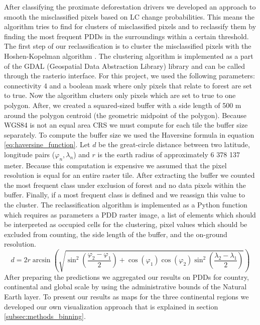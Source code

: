 			After classifying the proximate deforestation drivers we developed an approach to smooth the misclassified pixels based on \ac{LC} change probabilities. This means the algorithm tries to find for clusters of misclassified pixels and to reclassify them by finding the most frequent \acp{PDD} in the surroundings within a certain threshold. The first step of our reclassification is to cluster the misclassified pixels with the Hoshen-Kopelman algorithm \citep{Hoshen1998}. The clustering algorithm is implemented as a part of the GDAL (Geospatial Data Abstraction Library) library and can be called through the rasterio interface. For this project, we used the following parameters: connectivity 4 and a boolean mask where only pixels that relate to forest are set to true. Now the algorithm clusters only pixels which are set to true to one polygon. After, we created a squared-sized buffer with a side length of 500 m around the polygon centroid (the geometric midpoint of the polygon). Because \ac{WGS84} is not an equal area \ac{CRS} we must compute for each tile the buffer size separately. To compute the buffer size we used the Haversine formula in equation \ref{eq:haversine_function}. Let $d$ be the great-circle distance between two latitude, longitude pairs ($\varphi_n, \lambda_n$) and $r$ is the earth radius of approximately 6 378 137 meter. Because this computation is expensive we assumed that the pixel resolution is equal for an entire raster tile. After extracting the buffer we counted the most frequent class under exclusion of forest and no data pixels within the buffer. Finally, if a most frequent class is defined and we reassign this value to the cluster. The reclassification algorithm is implemented as a Python function which requires as parameters a \ac{PDD} raster image, a list of elements which should be interpreted as occupied cells for the clustering, pixel values which should be excluded from counting, the side length of the buffer, and the on-ground resolution. 
			\begin{equation}
			\label{eq:haversine_function}
				d = 2r\arcsin\left(
				\sqrt{
						\sin^2\left(\frac{\varphi_2-\varphi_1}{2}\right)+\cos\left(\varphi_1\right)\cos\left(\varphi_2\right)\sin^2\left(\frac{\lambda_2-\lambda_1}{2}\right)
				}
				\right)
			\end{equation}
			After preparing the predictions we aggregated our results on \acp{PDD} for country, continental and global scale by using the administrative bounds of the Natural Earth layer. To present our results as maps for the three continental regions we developed our own visualization approach that is explained in section \ref{subsec:methods_binning}.

